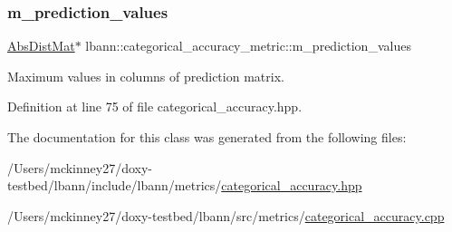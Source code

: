 \subsubsection{\texorpdfstring{m\+\_\+prediction\+\_\+values}{m\_prediction\_values}}
{\footnotesize\ttfamily \hyperlink{base_8hpp_a9a697a504ae84010e7439ffec862b470}{Abs\+Dist\+Mat}$\ast$ lbann\+::categorical\+\_\+accuracy\+\_\+metric\+::m\+\_\+prediction\+\_\+values\hspace{0.3cm}{\ttfamily [private]}}

Maximum values in columns of prediction matrix. 

Definition at line 75 of file categorical\+\_\+accuracy.\+hpp.



The documentation for this class was generated from the following files\+:\begin{DoxyCompactItemize}
\item 
/\+Users/mckinney27/doxy-\/testbed/lbann/include/lbann/metrics/\hyperlink{categorical__accuracy_8hpp}{categorical\+\_\+accuracy.\+hpp}\item 
/\+Users/mckinney27/doxy-\/testbed/lbann/src/metrics/\hyperlink{categorical__accuracy_8cpp}{categorical\+\_\+accuracy.\+cpp}\end{DoxyCompactItemize}
